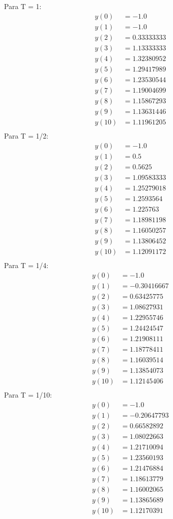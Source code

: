 \documentclass[10pt]{article}
\begin{document}
Para T = 1:
\begin{align*}
    y(0) &= -1.0\\
    y(1) &= -1.0\\
    y(2) &= 0.33333333\\
    y(3) &= 1.13333333\\
    y(4) &= 1.32380952\\
    y(5) &= 1.29417989\\
    y(6) &= 1.23530544\\
    y(7) &= 1.19004699\\
    y(8) &= 1.15867293\\
    y(9) &= 1.13631446\\
    y(10) &= 1.11961205\\
\end{align*}
Para T = 1/2:
\begin{align*}
    y(0) &= -1.0\\
    y(1) &= 0.5\\
    y(2) &= 0.5625\\
    y(3) &= 1.09583333\\
    y(4) &= 1.25279018\\
    y(5) &= 1.2593564\\
    y(6) &= 1.225763\\
    y(7) &= 1.18981198\\
    y(8) &= 1.16050257\\
    y(9) &= 1.13806452\\
    y(10) &= 1.12091172\\
\end{align*}
Para T = 1/4:
\begin{align*}
    y(0) &= -1.0\\
    y(1) &= -0.30416667\\
    y(2) &= 0.63425775\\
    y(3) &= 1.08627931\\
    y(4) &= 1.22955746\\
    y(5) &= 1.24424547\\
    y(6) &= 1.21908111\\
    y(7) &= 1.18778411\\
    y(8) &= 1.16039514\\
    y(9) &= 1.13854073\\
    y(10) &= 1.12145406\\
\end{align*}
Para T = 1/10:
\begin{align*}
    y(0) &= -1.0\\
    y(1) &= -0.20647793\\
    y(2) &= 0.66582892\\
    y(3) &= 1.08022663\\
    y(4) &= 1.21710094\\
    y(5) &= 1.23560193\\
    y(6) &= 1.21476884\\
    y(7) &= 1.18613779\\
    y(8) &= 1.16002065\\
    y(9) &= 1.13865689\\
    y(10) &= 1.12170391\\
\end{align*}
\end{document}
